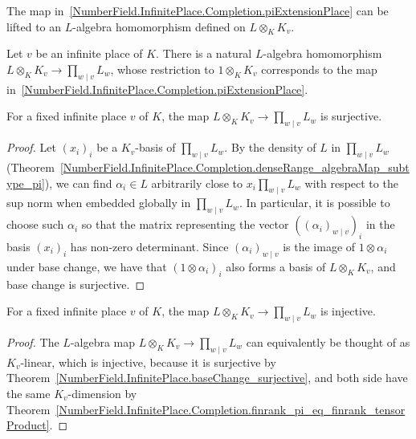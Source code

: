 The map in~\ref{NumberField.InfinitePlace.Completion.piExtensionPlace} can be lifted to an
$L$-algebra homomorphism defined on $L\otimes_K K_v$.

\begin{definition}
  \label{NumberField.InfinitePlace.Completion.baseChange}
  \leanok
  Let $v$ be an infinite place of $K$. There is a natural $L$-algebra homomorphism
  $L\otimes_K K_v \to \prod_{w\mid v}L_w$, whose restriction to $1\otimes_K K_v$ corresponds to
  the map in~\ref{NumberField.InfinitePlace.Completion.piExtensionPlace}.
\end{definition}

\begin{theorem}
  \label{NumberField.InfinitePlace.Completion.baseChange_surjective}
  \leanok
  For a fixed infinite place $v$ of $K$, the map $L\otimes_K K_v \to\prod_{w\mid v}L_w$ is
  surjective.
\end{theorem}
\begin{proof}
  Let $(x_i)_i$ be a $K_v$-basis of $\prod_{w\mid v}L_w$. By the density of $L$ in
  $\prod_{w\mid v}L_w$
  (Theorem~\ref{NumberField.InfinitePlace.Completion.denseRange_algebraMap_subtype_pi}), we can
  find $\alpha_i \in L$ arbitrarily close to $x_i\prod_{w\mid v}L_w$ with respect to the sup norm
  when embedded globally in $\prod_{w\mid v}L_w$.
  In particular, it is possible to choose such $\alpha_i$ so that the matrix representing
  the vector $((\alpha_i)_{w \mid v})_i$ in the basis $(x_i)_i$ has non-zero determinant.
  Since $(\alpha_i)_{w \mid v}$ is the image of $1\otimes \alpha_i$ under base change, we have
  that $(1 \otimes \alpha_i)_i$ also forms a basis of $L\otimes_K K_v$, and base change
  is surjective.
\end{proof}

\begin{theorem}
  \label{NumberField.InfinitePlace.Completion.baseChange_injective}
  \leanok
  For a fixed infinite place $v$ of $K$, the map $L\otimes_K K_v \to\prod_{w\mid v}L_w$ is
  injective.
\end{theorem}
\begin{proof}
  The $L$-algebra map $L\otimes_K K_v \to\prod_{w\mid v}L_w$ can equivalently be thought of
  as $K_v$-linear, which is injective, because it is surjective by
  Theorem~\ref{NumberField.InfinitePlace.baseChange_surjective}, and both side have the same
  $K_v$-dimension by
  Theorem~\ref{NumberField.InfinitePlace.Completion.finrank_pi_eq_finrank_tensorProduct}.
\end{proof}

